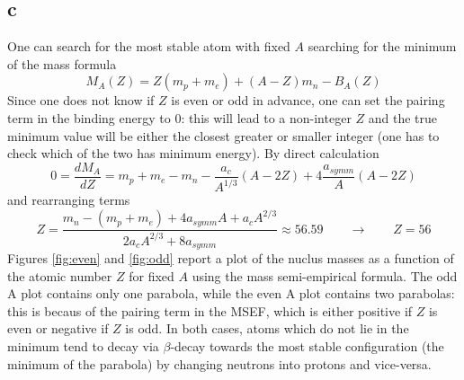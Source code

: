 \subsection*{c}
One can search for the most stable atom with fixed $A$ searching for the minimum of the mass formula
\begin{equation*}
    M_A(Z) = Z(m_p + m_e) + (A-Z)m_n - B_A(Z)
\end{equation*}
Since one does not know if $Z$ is even or odd in advance, one can set the pairing term in the binding energy to $0$: this will lead to a non-integer $Z$ and 
the true minimum value will be either the closest greater or smaller integer (one has to check which of the two has minimum energy).
By direct calculation
\begin{equation*}
    0 = \frac{dM_A}{dZ} = m_p + m_e - m_n - \frac{a_c}{A^{1/3}} \left(A-2Z\right) + 4\frac{a_{symm}}{A} \left(A-2Z\right)
\end{equation*}
and rearranging terms
\begin{equation*}
    Z = \frac{m_n - (m_p + m_e) + 4a_{symm}A + a_c A^{2/3}}{2a_c A^{2/3} + 8a_{symm}} \approx 56.59 \qquad \longrightarrow \qquad Z = 56
\end{equation*}
Figures \ref{fig:even} and \ref{fig:odd} report a plot of the nuclus masses as a function of the atomic number $Z$ for fixed $A$ using the mass 
semi-empirical formula. The odd A plot contains only one parabola, while the even A plot contains two parabolas: this is becaus of the pairing term in the 
MSEF, which is either positive if $Z$ is even or negative if $Z$ is odd. In both cases, atoms which do not lie in the minimum tend to decay via $\beta$-decay towards
the most stable configuration (the minimum of the parabola) by changing neutrons into protons and vice-versa. 
